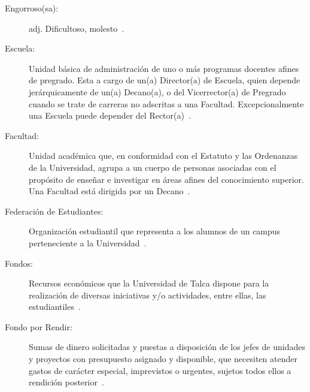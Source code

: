 \begin{glosario}
	\item 	\begin{description}
		\item[Engorroso(sa):] adj. Dificultoso, molesto~\cite{14}.
	\end{description}

	\item 	\begin{description}
		\item[Escuela:] Unidad básica de administración de uno o más programas docentes afines de pregrado. Esta a cargo de un(a) Director(a) de Escuela, quien depende jerárquicamente de un(a) Decano(a), o del Vicerrector(a) de Pregrado cuando se trate de carreras no adscritas a una Facultad. Excepcionalmente una Escuela puede depender del Rector(a)~\cite{1}.
	\end{description}

	\item 	\begin{description}
		\item[Facultad:] Unidad académica que, en conformidad con el Estatuto y las Ordenanzas de la Universidad, agrupa a un cuerpo de personas asociadas con el propósito de enseñar e investigar en áreas afines del conocimiento superior. Una Facultad está dirigida por un Decano~\cite{1}.
	\end{description}

	\item 	\begin{description}
		\item[Federación de Estudiantes:] Organización estudiantil que representa a los alumnos de un campus perteneciente a la Universidad~\cite{2}.
	\end{description}

	\item 	\begin{description}
		\item[Fondos:] Recursos  económicos  que  la  Universidad  de  Talca  dispone  para  la  realización  de diversas iniciativas y/o actividades, entre ellas, las estudiantiles~\cite{1}.
	\end{description}

	\item 	\begin{description}
			\item[Fondo por Rendir:] Sumas de dinero solicitadas y puestas a disposición de los jefes de unidades y proyectos con presupuesto asignado y disponible, que necesiten atender gastos de carácter especial, imprevistos o urgentes, sujetos todos ellos a rendición posterior~\cite{1}.
		\end{description}
	

\end{glosario}
